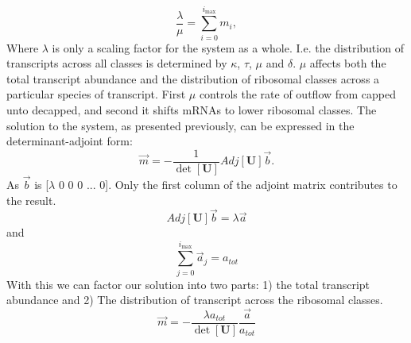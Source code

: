 \documentclass[review]{elsarticle}
\newcommand{\imax}{\ensuremath{{i_{\max}}}\xspace}
\let\bs\boldsymbol
\begin{document}
	\begin{equation}
		\frac{\lambda}{\mu}=\sum_{i=0}^{\imax}m_{i},
	\end{equation}
Where $\lambda$ is only a scaling factor for the system as a whole. I.e. the distribution of transcripts across all classes is determined by $\kappa$, $\tau$, $\mu$ and $\delta$. %
$\mu$ affects both the total transcript abundance and the distribution of ribosomal classes across a particular species of transcript.
First $\mu$ controls the rate of outflow from capped unto decapped, and second it shifts mRNAs to lower ribosomal classes.
The solution to the system, as presented previously, can be expressed in the determinant-adjoint form:
	\begin{equation*}
		\vec{m}=-\frac{1}{\det[\bs{U}]}Adj[\bs{U}]\vec{b}.
	\end{equation*}
As $\vec{b}$ is [$\lambda$ 0 0 0 ... 0]. Only the first column of the adjoint matrix contributes to the result. 
	\begin{equation*}
		Adj[\bs{U}]\vec{b} = \lambda\vec{a}
	\end{equation*}	
and
	\begin{equation*}
		\sum_{j=0}^{\imax}\vec{a}_j = a_{tot} 
	\end{equation*}
With this we can factor our solution into two parts: 1) the total transcript abundance and 2) The distribution of transcript across the ribosomal classes.
	\begin{equation*}
		\vec{m}=-\frac{\lambda a_{tot}}{\det[\bs{U}]} \frac{\vec{a}}{a_{tot}} 
	\end{equation*}
\end{document}

